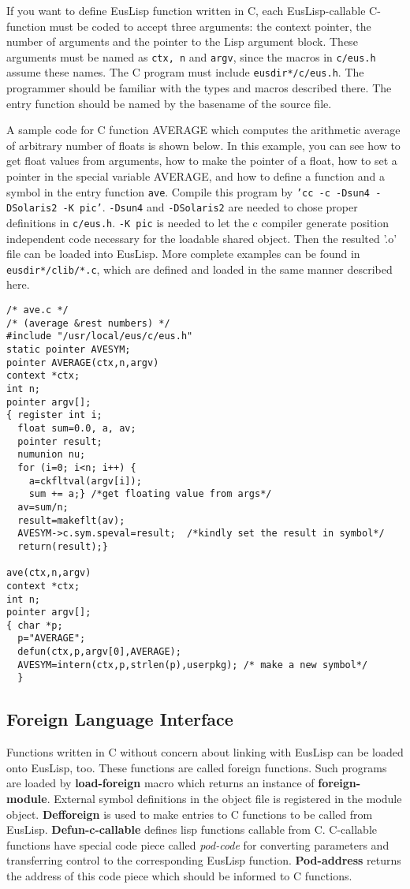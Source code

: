 If you want to define EusLisp function written in C,
each EusLisp-callable C-function must be coded to accept three arguments:
the context pointer, the number of arguments and the pointer to the Lisp
argument block.
These arguments must be named as {\tt ctx, n} and {\tt argv},
since the macros in {\tt c/eus.h} assume these names.
The C program must include {\tt *eusdir*/c/eus.h}.
The programmer should be familiar with the types and macros
described there.
The entry function should be named by the basename of the source file.

A sample code for C function AVERAGE which computes the arithmetic
average of arbitrary number of floats is shown below.
In this example, you can see how to get float values from arguments,
how to make the pointer of a float,
how to set a pointer in the special variable AVERAGE,
and how to define a function and a symbol in the entry function {\tt ave}.
Compile this program by {\tt 'cc -c -Dsun4 -DSolaris2 -K pic'}.
{\tt -Dsun4} and {\tt -DSolaris2} are needed
to chose proper definitions in {\tt c/eus.h}.
{\tt -K pic} is needed to let the c compiler generate position independent
code necessary for the loadable shared object. 
Then the resulted '.o' file can be loaded into EusLisp.
More complete examples can be found in {\tt *eusdir*/clib/*.c},
which are defined and loaded in the same manner described here.

\begin{verbatim}
/* ave.c */
/* (average &rest numbers) */
#include "/usr/local/eus/c/eus.h"
static pointer AVESYM;
pointer AVERAGE(ctx,n,argv)
context *ctx;
int n;
pointer argv[];
{ register int i;
  float sum=0.0, a, av;
  pointer result;
  numunion nu;
  for (i=0; i<n; i++) {
    a=ckfltval(argv[i]);
    sum += a;} /*get floating value from args*/
  av=sum/n;
  result=makeflt(av);
  AVESYM->c.sym.speval=result;  /*kindly set the result in symbol*/
  return(result);}

ave(ctx,n,argv)
context *ctx;
int n;
pointer argv[];
{ char *p;
  p="AVERAGE";
  defun(ctx,p,argv[0],AVERAGE);
  AVESYM=intern(ctx,p,strlen(p),userpkg); /* make a new symbol*/
  }     

\end{verbatim}

\subsection{Foreign Language Interface}

Functions written in C without concern about linking with EusLisp
can be loaded onto EusLisp, too.
These functions are called foreign functions.
Such programs are loaded by
{\bf load-foreign} macro which returns an instance of {\bf foreign-module}.
External symbol definitions in the object file is registered
in the module object.
{\bf Defforeign} is used to make entries to  C functions
to be called from EusLisp.
{\bf Defun-c-callable} defines lisp functions callable from C.
C-callable functions have special code piece called {\em pod-code}
for converting parameters and transferring control to the corresponding
EusLisp function.
{\bf Pod-address} returns the address of this code piece which
should be informed to C functions.

